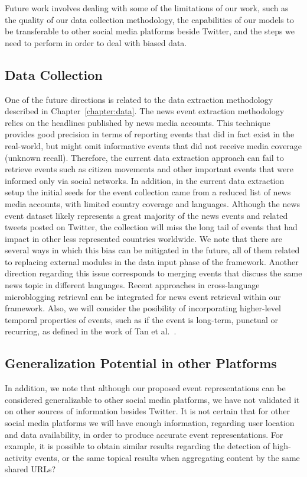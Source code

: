 Future work involves dealing with some of the limitations of our work, such as
the quality of our data collection methodology, the capabilities of our models
to be transferable to other social media platforms beside Twitter, and the steps
we need to perform in order to deal with biased data.

\subsection*{Data Collection}
One of the future directions is related to the data extraction methodology
described in Chapter~\ref{chapter:data}. 
%
The news event extraction methodology relies on the headlines published by news
media accounts. 
%
This technique provides good precision in terms of reporting events that did in
fact exist in the real-world, but might omit informative events that did not
receive media coverage (unknown recall).
%
Therefore, the current data extraction approach can fail to retrieve events such
as citizen movements and other important events that were informed only via
social networks.  
%
In addition, in the current data extraction setup the initial seeds for the
event collection came from a reduced list of news media accounts, with limited
country coverage and languages.
%
Although the news event dataset likely represents a great majority of the news
events and related tweets posted on Twitter, the collection will miss the long
tail of events that had impact in other less represented countries worldwide. 
%
We note that there are several ways in which this bias can be mitigated in the
future, all of them related to replacing external modules in the data input
phase of the framework.
%
Another direction regarding this issue corresponds to merging events that
discuss the same news topic in different languages. 
%
Recent approaches in cross-language microblogging retrieval
\cite{Godavarthy2016} can be integrated for news event retrieval within our
framework.
%
Also, we will consider the posibility of incorporating higher-level temporal
properties of events, such as if the event is long-term, punctual or recurring,
as defined in the work of Tan et al.~\cite{st-model_2009}.


\subsection*{Generalization Potential in other Platforms}
In addition, we note that although our proposed event representations can be
considered generalizable to other social media platforms, we have not validated
it on other sources of information besides Twitter. 
%
It is not certain that for other social media platforms we will have enough
information, regarding user location and data availability, in order to produce
accurate event representations.
%
For example, it is possible to obtain similar results regarding the detection of
high-activity events, or the same topical results when aggregating content by
the same shared URLs?



